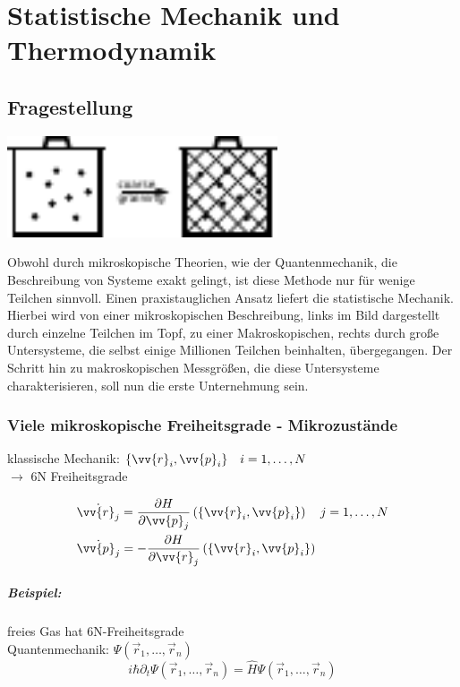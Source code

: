 \chapter{Statistische Mechanik und Thermodynamik}

    \section{Fragestellung}

\begin{center}
    \includegraphics[width=0.6\textwidth]{Abb/1_1.pdf}
\end{center}
Obwohl durch mikroskopische Theorien, wie der Quantenmechanik, die Beschreibung
von Systeme exakt gelingt, ist diese Methode nur für wenige Teilchen sinnvoll.
Einen praxistauglichen Ansatz liefert die statistische Mechanik. Hierbei wird
von einer mikroskopischen Beschreibung, links im Bild dargestellt durch einzelne
Teilchen im Topf, zu einer Makroskopischen, rechts durch große Untersysteme, die
selbst einige Millionen Teilchen beinhalten, übergegangen. Der Schritt hin zu
makroskopischen Messgrößen, die diese Untersysteme charakterisieren, soll nun
die erste Unternehmung sein.

    \subsection{Viele mikroskopische Freiheitsgrade - Mikrozustände}

klassische Mechanik: $\{\vv{r}_i, \vv{p}_i\} \quad i = 1, \dots , N$\\
$\rightarrow$ 6N Freiheitsgrade

\begin{align*}
    &\dot{\vv{r}_j} = \frac{\partial H}{\partial \vv{p}_j} \left( \{
                      \vv{r}_i, \vv{p}_i \} \right) \quad j = 1, \dots, N\\
    &\dot{\vv{p}_j} = - \frac{\partial H}{\partial \vv{r}_j} \left( \{
                         \vv{r}_i, \vv{p}_i\}\right)
\end{align*}

\paragraph{Beispiel:} freies Gas hat 6N-Freiheitsgrade\\
    \indent Quantenmechanik: $\Psi \left( \vec{r}_1, \dots, \vec{r}_n \right)$\\
    \[
        i \hbar \partial_t \Psi \left( \vec{r}_1, \dots, \vec{r}_n \right) =
        \hat{H} \Psi \left( \vec{r}_1, \dots, \vec{r}_n \right)
    \]

